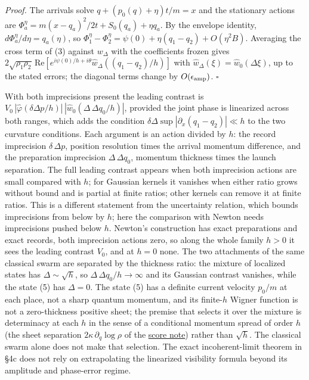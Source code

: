 \documentclass[11pt,a4paper]{article}
\begin{document}
\emph{Proof.} The arrivals solve \(q+(p_0(q)+\eta)t/m=x\) and the
stationary actions are \(\Phi^\eta_a=m(x-q_a)^2/2t+S_0(q_a)+\eta q_a\).
By the envelope identity, \(d\Phi^\eta_a/d\eta=q_a(\eta)\), so
\(\Phi^\eta_1-\Phi^\eta_2=\psi(0)+\eta(q_1-q_2)+O(\eta^2B)\). Averaging
the cross term of (3) against \(w_\Delta\) with the coefficients frozen
gives
\(2\sqrt{\rho_1\rho_2}\,\mathrm{Re}[e^{i\psi(0)/h+i\theta}\hat w_\Delta((q_1-q_2)/h)]\)
with \(\hat w_\Delta(\xi)=\hat w_0(\Delta\xi)\), up to the stated
errors; the diagonal terms change by \(O(\epsilon_{\rm amp})\).
\(\square\)

With both imprecisions present the leading contrast is
\(V_0\,|\hat\varphi(\delta\Delta p/h)|\,|\hat w_0(\Delta\,\Delta q_0/h)|\),
provided the joint phase is linearized across both ranges, which adds
the condition \(\delta\Delta\sup|\partial_x(q_1-q_2)|\ll h\) to the two
curvature conditions. Each argument is an action divided by \(h\): the
record imprecision \(\delta\,\Delta p\), position resolution times the
arrival momentum difference, and the preparation imprecision
\(\Delta\,\Delta q_0\), momentum thickness times the launch separation.
The full leading contrast appears when both imprecision actions are
small compared with \(h\); for Gaussian kernels it vanishes when either
ratio grows without bound and is partial at finite ratios; other kernels
can remove it at finite ratios. This is a different statement from the
uncertainty relation, which bounds imprecisions from below by \(h\);
here the comparison with Newton needs imprecisions pushed below \(h\).
Newton's construction has exact preparations and exact records, both
imprecision actions zero, so along the whole family \(h>0\) it sees the
leading contrast \(V_0\), and at \(h=0\) none. The two attachments of
the same classical swarm are separated by the thickness ratio: the
mixture of localized states has \(\Delta\sim\sqrt h\), so
\(\Delta\,\Delta q_0/h\to\infty\) and its Gaussian contrast vanishes,
while the state (5) has \(\Delta=0\). The state (5) has a definite
current velocity \(p_0/m\) at each place, not a sharp quantum momentum,
and its finite-\(h\) Wigner function is not a zero-thickness positive
sheet; the premise that selects it over the mixture is determinacy at
each \(h\) in the sense of a conditional momentum spread of order \(h\)
(the sheet separation \(2\kappa\,\partial_q\log\rho\) of the
\href{score-constrained-ensemble.md}{score note}) rather than
\(\sqrt h\). The classical swarm alone does not make that selection. The
exact incoherent-limit theorem in §4c does not rely on extrapolating the
linearized visibility formula beyond its amplitude and phase-error
regime.
\end{document}
